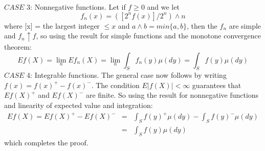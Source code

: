 \documentclass{article}
\begin{document}
$CASE$ 3: Nonnegative functions. Let if $f \geq 0$ and we let 
$$ f_n (x) = ([2^n f(x)]/2^n) \wedge n$$
where [x] = the largest integer $\leq x$ and $a\wedge b = min \{a,b\}$, then the $f_n$ are simple and $f_n \uparrow f$, so using the result for simple functions and the monotone convergence theorem:
$$Ef(X) = \lim_{n} Ef_n(X) = \lim_{n} \int_S f_n(y)\mu (dy) = \int_S f(y)\mu (dy)$$
\newpage
$CASE$ 4: Integrable functions. The general case now follows by writing $f(x) = f(x)^+ - f(x)^-$. The condition $E|f(X)| < \infty$ guarantees that $Ef(X)^+$ and $Ef(X)^-$ are finite. So using the result for nonnegative functions and linearity of expected value and integration:
\begin{eqnarray}
Ef(X) = Ef(X)^+ - Ef(X)^- &=& \int_S f(y)^+\mu (dy) - \int_S f(y)^-\mu (dy) \nonumber\\
&=& \int_S f(y)\mu (dy) \nonumber
\end{eqnarray}
which completes the proof.
\end{document}
